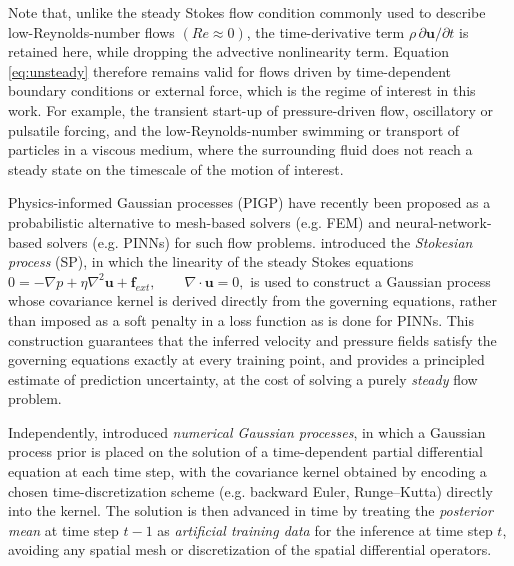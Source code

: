 \documentclass[11pt, a4paper]{report}
\begin{document}
\noindent Note that, unlike the steady Stokes flow condition commonly used to
describe low-Reynolds-number flows \((Re \approx 0)\), the time-derivative term \(\rho\,\partial\boldsymbol{u}/\partial t\)
is retained here, while dropping the advective nonlinearity term. Equation
\eqref{eq:unsteady} therefore remains valid for flows driven by time-dependent
boundary conditions or external force, which is the regime of interest in this work.
For example, the transient start-up of pressure-driven flow, oscillatory or
pulsatile forcing, and the low-Reynolds-number swimming or transport of
particles in a viscous medium, where the surrounding fluid does not reach a
steady state on the timescale of the motion of interest.

\vspace{0.3cm}

Physics-informed Gaussian processes (PIGP) have recently been proposed as a
probabilistic alternative to mesh-based solvers (e.g. FEM) and neural-network-based
solvers (e.g. PINNs) for such flow problems. \textcite{Molina2023} introduced the
\emph{Stokesian process} (SP), in which the linearity of the steady Stokes equations \(
    0 = -\nabla p + \eta{\nabla}^{2} \boldsymbol{u} + \boldsymbol{f}_{ext}, \qquad \nabla\cdot\boldsymbol{u} = 0,\) 
is used to construct a Gaussian process whose covariance kernel is derived directly from the governing
equations, rather than imposed as a soft penalty in a loss function as is done for
PINNs. This construction guarantees that the inferred velocity and pressure fields
satisfy the governing equations exactly at every training point, and
provides a principled estimate of prediction uncertainty, at the cost of solving a
purely \emph{steady} flow problem.

\vspace{0.3cm}

Independently, \textcite{Raissi2018} introduced \emph{numerical Gaussian processes},
in which a Gaussian process prior is placed on the solution of a time-dependent
partial differential equation at each time step, with the covariance kernel obtained
by encoding a chosen time-discretization scheme (e.g. backward Euler, Runge--Kutta)
directly into the kernel. The solution is then advanced in time by treating the
\emph{posterior mean} at time step \(t-1\) as \emph{artificial training data} for the inference at time step \(t\), 
avoiding any spatial mesh or discretization of the spatial differential operators.

\vspace{0.3cm}
\end{document}
